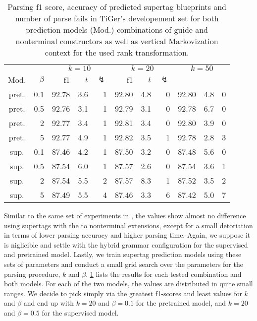 \documentclass[../../document.tex]{subfiles}
\begin{document}
    \begin{table}
        \caption{\label{tbl:experiments:tiger:k}
        Parsing f1 score, accuracy of predicted  supertag blueprints and number of parse fails in TiGer's developement set for both prediction models (Mod.) combinations of guide and nonterminal constructors as well as vertical Markovization context for the used rank transformation.
        }
        \centering
        \setlength{\tabcolsep}{4pt}
        \vspace{.2cm}
        \begin{tabular}{cr|rrr|rrr|rrr}
            \toprule
&      &      \multicolumn{3}{c|}{$k = 10$} & \multicolumn{3}{c|}{$k = 20$} & \multicolumn{3}{c|}{$k = 50$} \\
Mod. &  $\beta$  & f1 & $t$ & $\lightning$ & f1 & $t$ & $\lightning$ \\ \hline
pret. & 0.1  & 92.78 & 3.6 & 1 & 92.80 & 4.8 & 0 & 92.80 & 4.8 & 0 \\
pret. & 0.5  & 92.76 & 3.1 & 1 & 92.79 & 3.1 & 0 & 92.78 & 6.7 & 0 \\
pret. &   2  & 92.77 & 3.4 & 1 & 92.81 & 3.4 & 0 & 92.80 & 3.9 & 0 \\
pret. &   5  & 92.77 & 4.9 & 1 & 92.82 & 3.5 & 1 & 92.78 & 2.8 & 3 \\
\midrule 
sup. & 0.1  & 87.46 & 4.2 & 1 & 87.50 & 3.2 & 0 & 87.48 & 5.6 & 0 \\
sup. & 0.5  & 87.54 & 6.0 & 1 & 87.57 & 2.6 & 0 & 87.54 & 3.6 & 1 \\
sup. &   2  & 87.54 & 5.5 & 2 & 87.57 & 8.3 & 1 & 87.52 & 3.5 & 2 \\
sup. &   5  & 87.49 & 5.5 & 4 & 87.46 & 3.3 & 6 & 87.42 & 5.0 & 7 \\
    \bottomrule
        \end{tabular}
    \end{table}

    Similar to the same set of experiments in , the values show almost no difference using  supertags with the to nonterminal extensions, except for a small detoriation in terms of lower parsing accuracy and higher parsing time.
    Again, we suppose it is niglicible and settle with the hybrid grammar configuration for the supervised and pretrained model.
    Lastly, we train supertag prediction models using these sets of parameters and conduct a small grid search over the parameters for the parsing procedure, $k$ and $\beta$.
    \cref{tbl:experiments:tiger:k} lists the results for each tested combination and both models.
    For each of the two models, the values are distributed in quite small ranges.
    We decide to pick simply via the greatest f1-scores and least values for \(k\) and \(\beta\) and end up with \(k=20\) and \(\beta=0.1\) for the pretrained model, and \(k=20\) and \(\beta=0.5\) for the supervised model.
\end{document}
